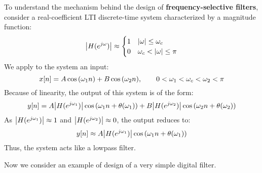 \documentclass[../../main/main.tex]{subfiles}
\begin{document}
To understand the mechanism behind the design of \textbf{frequency-selective filters}, consider a real-coefficient LTI discrete-time system characterized by a magnitude function:
\begin{equation}
    \abs{H(e^{j \omega})}
    \approx
    \begin{cases}
        1   &   \abs{\omega} \le \omega_{c} \\
        0   &   \omega_{c} < \abs{\omega} \le \pi
    \end{cases}
    \label{eq:L09_S58_1}
\end{equation}
We apply to the system an input:
\begin{equation}
    x[n]
    =
    A \cos\qty(\omega_{1}n) + B \cos\qty(\omega_{2}n),
    \qquad
    0 < \omega_{1} < \omega_{c} < \omega_{2} < \pi
    \label{eq:L09_S59_1}
\end{equation}
Because of linearity, the output of this system is of the form:
\begin{equation}
    y[n]
    =
    A \abs{H(e^{j \omega_{1}})} \cos\qty(\omega_{1}n + \theta(\omega_{1})) +
    B \abs{H(e^{j \omega_{2}})} \cos\qty(\omega_{2}n + \theta(\omega_{2}))
    \label{eq:L09_S59_2}
\end{equation}
As \( \abs{H(e^{j \omega_{1}})} \approx 1 \) and \( \abs{H(e^{j \omega_{2}})} \approx 0 \), the output reduces to:
\begin{equation}
    y[n]
    \approx
    A \abs{H(e^{j \omega_{1}})} \cos\qty(\omega_{1}n + \theta(\omega_{1}))
    \label{eq:L09_S60_2}
\end{equation}
Thus, the system acts like a lowpass filter.

Now we consider an example of design of a very simple digital filter.
\end{document}
